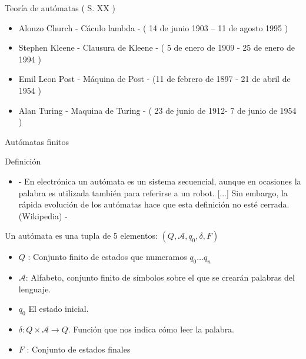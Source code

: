 \begin{frame}[fragile]{Teoría de autómatas ( S. XX )}

	\begin{itemize}
		\item Alonzo Church - Cáculo lambda - ( 14 de junio 1903 – 11 de agosto 1995 )
		\item Stephen Kleene - Clausura de Kleene - (  5 de enero de 1909 - 25 de enero de 1994 )
		\item  Emil Leon Post - Máquina de Post - (11 de febrero de 1897  - 21 de abril de 1954 )
		\item Alan Turing  - Maquina de Turing - ( 23 de junio de 1912- 7 de junio de 1954 )
	\end{itemize}


\end{frame}

\begin{frame}[fragile]{Autómatas finitos}

\begin{block}{Definición}
	\begin{itemize}
		\pause
		\item -  En electrónica un autómata es un sistema secuencial, aunque en ocasiones la palabra es
		utilizada también para referirse a un robot. [...] Sin embargo, la rápida evolución de los autómatas hace que esta definición no esté cerrada. (Wikipedia) -
	\end{itemize}
\end{block}
\pause 
Un autómata  es una tupla de 5 elementos: $(Q, \mathcal{A}, q_0, \delta, F)$

\begin{itemize}
	\item $Q$ : Conjunto finito de estados que numeramos $ q_0 \dots q_n$ \pause
	\item $\mathcal{A}$: Alfabeto, conjunto finito de símbolos sobre el que se crearán palabras del lenguaje. \pause
	\item $q_0$ El estado inicial. \pause
	\item $\delta :Q\times \mathcal{A} \rightarrow Q$. Función que nos indica cómo leer la palabra. \pause
	\item $F$ : Conjunto de estados finales
\end{itemize}


\end{frame}


